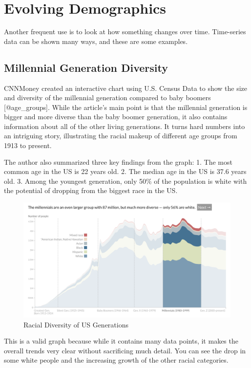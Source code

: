 \documentclass[]{book}
\theoremstyle{definition}
\theoremstyle{definition}
\theoremstyle{definition}
\theoremstyle{remark}
\begin{document}
\section{Evolving Demographics}\label{evolving-demographics}

Another frequent use is to look at how something changes over time.
Time-series data can be shown many ways, and these are some examples.

\subsection{Millennial Generation
Diversity}\label{millennial-generation-diversity}

CNNMoney created an interactive chart using U.S. Census Data to show the
size and diversity of the millennial generation compared to baby boomers
{[}@age\_groups{]}. While the article's main point is that the
millennial generation is bigger and more diverse than the baby boomer
generation, it also contains information about all of the other living
generations. It turns hard numbers into an intriguing story,
illustrating the racial makeup of different age groups from 1913 to
present.

The author also summarized three key findings from the graph: 1. The
most common age in the US is 22 years old. 2. The median age in the US
is 37.6 years old. 3. Among the youngest generation, only 50\% of the
population is white with the potential of dropping from the biggest race
in the US.

\begin{figure}
\centering
\includegraphics{images/millenials_diversity.png}
\caption{Racial Diversity of US Generations}
\end{figure}

This is a valid graph because while it contains many data points, it
makes the overall trends very clear without sacrificing much detail. You
can see the drop in some white people and the increasing growth of the
other racial categories.
\end{document}
